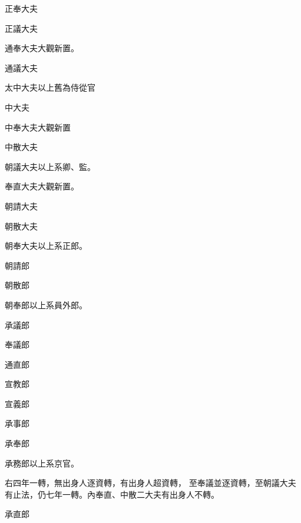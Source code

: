 \begin{pinyinscope}
 正奉大夫



 正議大夫



 通奉大夫大觀新置。



 通議大夫



 太中大夫以上舊為侍從官



 中大夫



 中奉大夫大觀新置



 中散大夫



 朝議大夫以上系卿、監。



 奉直大夫大觀新置。



 朝請大夫



 朝散大夫



 朝奉大夫以上系正郎。



 朝請郎



 朝散郎



 朝奉郎以上系員外郎。



 承議郎



 奉議郎



 通直郎



 宣教郎



 宣義郎



 承事郎



 承奉郎



 承務郎以上系京官。



 右四年一轉，無出身人逐資轉，有出身人超資轉，
 至奉議並逐資轉，至朝議大夫有止法，仍七年一轉。內奉直、中散二大夫有出身人不轉。



 承直郎




\end{pinyinscope}
